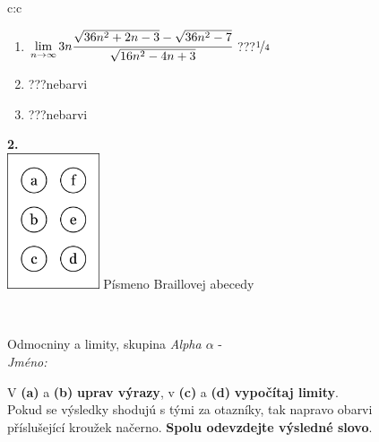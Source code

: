 \documentclass[10pt]{report}
\begin{document}
\begin{tabular}{c:c}
\begin{minipage}[c][104.5mm][t]{0.5\linewidth}
\begin{center}
\begin{minipage}{0.79\linewidth}
\begin{center}
\begin{varwidth}{\linewidth}
\begin{enumerate}
\item $\lim\limits_{n\to\infty}3n\cfrac{\sqrt{36n^2+2n-3}-\sqrt{36n^2-7}}{\sqrt{16n^2-4n+3}}$\quad \dotfill\; ???\;\dotfill \quad $\nicefrac{1}{4}$
\item \quad \dotfill\; ???\;\dotfill \quad nebarvi
\item \quad \dotfill\; ???\;\dotfill \quad nebarvi
\end{enumerate}
\end{varwidth}
\end{center}
\end{minipage}
\begin{minipage}{0.20\linewidth}
\begin{center}
{\Huge\bfseries 2.} \\[2mm]
\includegraphics[height=40mm]{../images/braille.png}
{\small Písmeno Braillovej abecedy}
\end{center}
\end{minipage}
\end{center}
\end{minipage}
\\ \hdashline
\begin{minipage}[c][104.5mm][t]{0.5\linewidth}
\begin{center}
\vspace{7mm}
{\huge Odmocniny a limity, skupina \textit{Alpha $\alpha$} -}\\[5mm]
\textit{Jméno:}\phantom{xxxxxxxxxxxxxxxxxxxxxxxxxxxxxxxxxxxxxxxxxxxxxxxxxxxxxxxxxxxxxxxxx}\\[5mm]
\begin{minipage}{0.95\linewidth}
\begin{center}
V \textbf{(a)} a \textbf{(b)} \textbf{uprav výrazy}, v \textbf{(c)} a \textbf{(d)} \textbf{vypočítaj limity}.\\Pokud se výsledky shodujú s tými za otazníky, tak napravo obarvi\\příslušející kroužek načerno. \textbf{Spolu odevzdejte výsledné slovo}.
\end{center}
\end{minipage}
\\[1mm]

\end{center}
\end{minipage}
\end{tabular}
\end{document}
